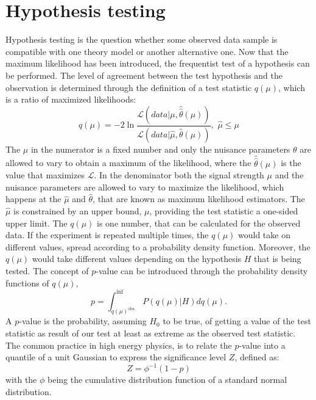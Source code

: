 \section{Hypothesis testing}
\noindent
\justify
Hypothesis testing is the question whether some observed data sample is compatible with one theory model or another alternative one.
Now that the maximum likelihood has been introduced, the frequentist test of a hypothesis can be performed. 
The level of agreement between the test hypothesis and the observation is determined through the definition of a test statistic $q(\mu)$, which is a ratio of maximized likelihoods:
\begin{equation}
q(\mu)=-2\ln\frac{\mathcal{L}(data|\mu, \hat{\hat{\theta}}(\mu))}{\mathcal{L}(data|\hat{\mu}, \hat{\theta}(\mu))},\, \, \hat{\mu}\leq\mu
\end{equation}
The $\mu$ in the numerator is a fixed number and only the nuisance parameters $\theta$ are allowed to vary to obtain a maximum of the likelihood, where the $\hat{\hat{\theta}}(\mu)$ is the value that maximizes $\mathcal{L}$.
In the denominator both the signal strength $\mu$ and the nuisance parameters are allowed to vary to maximize the likelihood, which happens at the $\hat{\mu}$ and $\hat{\theta}$, that are known as maximum likelihood estimators.
The $\hat{\mu}$ is constrained by an upper bound, $\mu$, providing the test statistic a one-sided upper limit. 
The $q(\mu)$ is one number, that can be calculated for the observed data. 
If the experiment is repeated multiple times, the $q(\mu)$ would take on different values, spread according to a probability density function.    
Moreover, the $q(\mu)$ would take different values depending on the hypothesis $H$ that is being tested. 
The concept of $p$-value can be introduced through the probability density functions of $q(\mu)$, 
\begin{equation}
p=\int_{q(\mu)^{\mathrm{obs.}}}^{\inf}P(q(\mu)|H)dq(\mu).
\end{equation} 
A $p$-value is the probability, assuming $H_{0}$ to be true, of getting a value of the test statistic as result of our test at least as extreme as the observed test statistic.
The common practice in high energy physics, is to relate the $p$-value into a quantile of a unit Gaussian to express the significance level $Z$, defined as:
\begin{equation}
Z=\phi^{-1}(1-p)
\end{equation}
with the $\phi$ being the cumulative distribution function of a standard normal distribution. 
